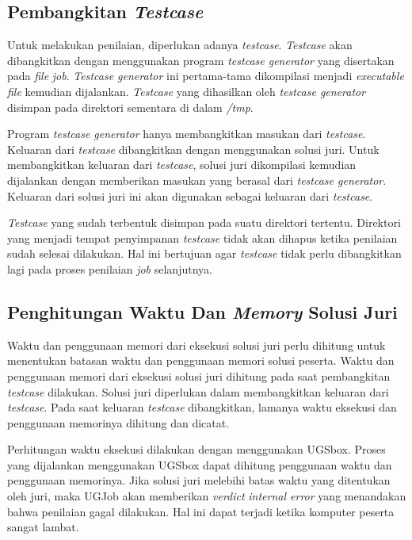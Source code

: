 \subsection{Pembangkitan \textit{Testcase}}

\par Untuk melakukan penilaian, diperlukan adanya \textit{testcase}. \textit{Testcase} akan dibangkitkan dengan menggunakan program \textit{testcase generator} yang disertakan pada \textit{file} \textit{job}. \textit{Testcase generator} ini pertama-tama dikompilasi menjadi \textit{executable file} kemudian dijalankan. \textit{Testcase} yang dihasilkan oleh \textit{testcase generator} disimpan pada direktori sementara di dalam \textit{/tmp}.


\par Program \textit{testcase generator} hanya membangkitkan masukan dari \textit{testcase}. Keluaran dari \textit{testcase} dibangkitkan dengan menggunakan solusi juri. Untuk membangkitkan keluaran dari \textit{testcase}, solusi juri dikompilasi kemudian dijalankan dengan memberikan masukan yang berasal dari \textit{testcase generator}. Keluaran dari solusi juri ini akan digunakan sebagai keluaran dari \textit{testcase}.

\par \textit{Testcase} yang sudah terbentuk disimpan pada suatu direktori tertentu. Direktori yang menjadi tempat penyimpanan \textit{testcase} tidak akan dihapus ketika penilaian sudah selesai dilakukan. Hal ini bertujuan agar \textit{testcase} tidak perlu dibangkitkan lagi pada proses penilaian \textit{job} selanjutnya.

\subsection{Penghitungan Waktu Dan \textit{Memory} Solusi Juri} 

\par Waktu dan penggunaan memori dari eksekusi solusi juri perlu dihitung untuk menentukan batasan waktu dan penggunaan memori solusi peserta. Waktu dan penggunaan memori dari eksekusi solusi juri dihitung pada saat pembangkitan \textit{testcase} dilakukan. Solusi juri diperlukan dalam membangkitkan keluaran dari \textit{testcase}. Pada saat keluaran \textit{testcase} dibangkitkan, lamanya waktu eksekusi dan penggunaan memorinya dihitung dan dicatat.

\par Perhitungan waktu eksekusi dilakukan dengan menggunakan UGSbox. Proses yang dijalankan menggunakan UGSbox dapat dihitung penggunaan waktu dan penggunaan memorinya. Jika solusi juri melebihi batas waktu yang ditentukan oleh juri, maka UGJob akan memberikan \textit{verdict} \textit{internal error} yang menandakan bahwa penilaian gagal dilakukan. Hal ini dapat terjadi ketika komputer peserta sangat lambat.

